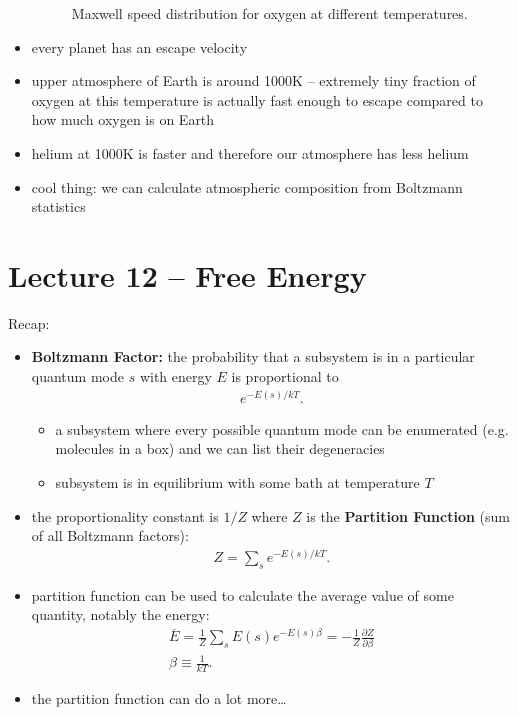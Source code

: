 \documentclass[10pt]{article}
\begin{document}
\begin{itemize}
\begin{figure}[H]
            \caption{Maxwell speed distribution for oxygen at different temperatures.}
            \label{fig:speedDistribution}
        \end{figure}
    \item every planet has an escape velocity
    \item upper atmosphere of Earth is around 1000K -- extremely tiny fraction of oxygen at this temperature is actually fast enough to escape compared to how much oxygen is on Earth
    \item helium at 1000K is faster and therefore our atmosphere has less helium
    \item cool thing: we can calculate atmospheric composition from Boltzmann statistics
\end{itemize}




\section{Lecture 12 -- Free Energy}
Recap:
\begin{itemize}
    \item \textbf{Boltzmann Factor:} the probability that a subsystem is in a particular quantum mode $s$ with energy $E$ is proportional to
        \begin{gather*}
            e^{-E(s) / kT}
        .\end{gather*}
        \begin{itemize}
            \item a subsystem where every possible quantum mode can be enumerated (e.g. molecules in a box) and we can list their degeneracies
            \item subsystem is in equilibrium with some bath at temperature $T$
        \end{itemize}
    \item the proportionality constant is $1 / Z$ where $Z$ is the \textbf{Partition Function} (sum of all Boltzmann factors):
        \begin{gather*}
            Z = \sum_{s} e^{-E(s) / kT}
        .\end{gather*}
    \item partition function can be used to calculate the average value of some quantity, notably the energy:
        \begin{gather*}
            \overline{E} = \frac{1}{Z} \sum_{s} E(s) e^{-E(s) \beta} = -\frac{1}{Z} \frac{\partial Z}{\partial \beta} \\ 
            \beta \equiv \frac{1}{kT}
        .\end{gather*}
    \item the partition function can do a lot more\ldots
\end{itemize}
\end{document}
